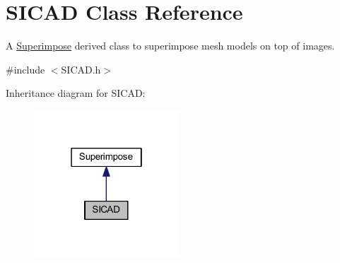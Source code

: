 \hypertarget{classSICAD}{}\section{S\+I\+C\+AD Class Reference}
\label{classSICAD}


A \mbox{\hyperlink{classSuperimpose}{Superimpose}} derived class to superimpose mesh models on top of images.  




{\ttfamily \#include $<$S\+I\+C\+A\+D.\+h$>$}



Inheritance diagram for S\+I\+C\+AD\+:
\nopagebreak
\begin{figure}[H]
\begin{center}
\leavevmode
\includegraphics[width=154pt]{classSICAD__inherit__graph}
\end{center}
\end{figure}
